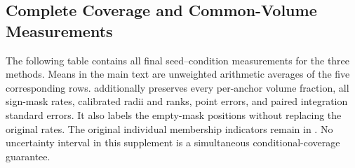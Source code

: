 \documentclass{article}
\begin{document}
\subsection{Complete Coverage and Common-Volume Measurements}
The following table contains all final seed--condition measurements for the three methods. Means in the main text are unweighted arithmetic averages of the five corresponding rows.  additionally preserves every per-anchor volume fraction, all sign-mask rates, calibrated radii and ranks, point errors, and paired integration standard errors. It also labels the empty-mask positions without replacing the original rates. The original individual membership indicators remain in . No uncertainty interval in this supplement is a simultaneous conditional-coverage guarantee.
\end{document}

